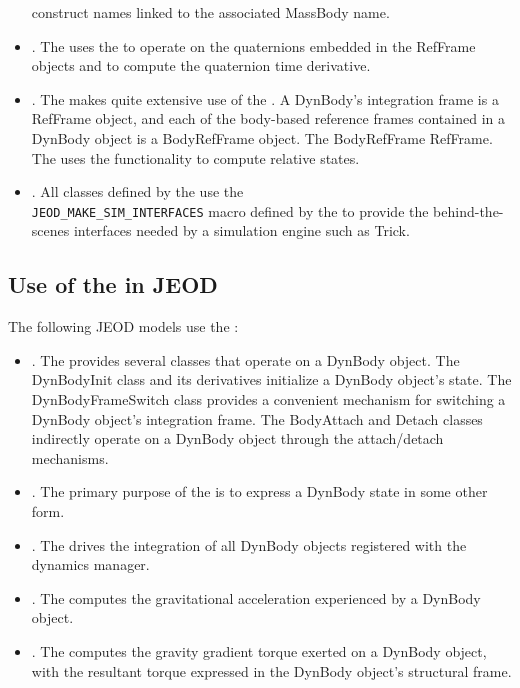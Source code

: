 \begin{itemize}
  construct names linked to the associated MassBody name.
\item{}. The \ModelDesc uses the \QUATERNION
  to operate on the quaternions embedded in the RefFrame objects and to
  compute the quaternion time derivative.
\item{}. The \ModelDesc makes quite extensive use of the
  \REFFRAMES. A DynBody's integration frame is a RefFrame object, and each of
  the body-based reference frames contained in a DynBody object is a
  BodyRefFrame object. The BodyRefFrame \isa RefFrame. The \ModelDesc uses
  the \REFFRAMES functionality to compute relative states.
\item{}. All classes defined by the \ModelDesc use
  the\\
  \verb+JEOD_MAKE_SIM_INTERFACES+ macro defined by the \SIMINTERFACE to provide
  the behind-the-scenes interfaces needed by a simulation engine such as Trick.
\end{itemize}


\subsection*{Use of the \ModelDesc in JEOD}
The following JEOD models use the \ModelDesc:
\begin{itemize}
\item{}. The \BODYACTION provides several classes that
  operate on a DynBody object. The DynBodyInit class and its derivatives
  initialize a DynBody object's state. The DynBodyFrameSwitch class provides
  a convenient mechanism for switching a DynBody object's integration frame.
  The BodyAttach and Detach classes indirectly operate on a DynBody object
  through the \ModelDesc attach/detach mechanisms.
\item{}. The primary purpose of the \DERIVEDSTATE
  is to express a DynBody state in some other form.
\item{}. The \DYNMANAGER drives the integration of
  all DynBody objects registered with the dynamics manager.
\item{}. The \GRAVITY computes the gravitational
  acceleration experienced by a DynBody object.
\item{}. The \GRAVITYTORQUE computes the gravity
  gradient torque exerted on a DynBody object, with the resultant torque
  expressed in the DynBody object's structural frame.
\end{itemize}
